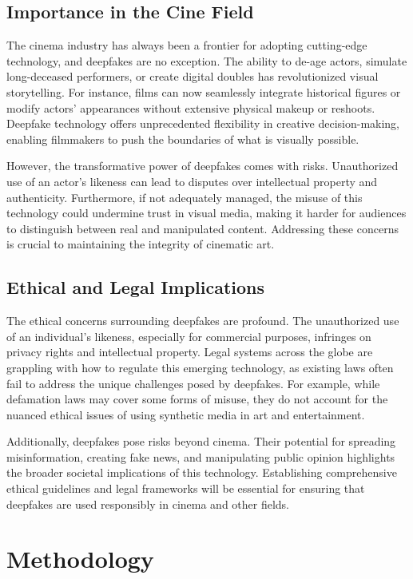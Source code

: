 \documentclass[12pt]{article}
\begin{document}
\subsection{Importance in the Cine Field}
The cinema industry has always been a frontier for adopting cutting-edge technology, and deepfakes are no exception. The ability to de-age actors, simulate long-deceased performers, or create digital doubles has revolutionized visual storytelling. For instance, films can now seamlessly integrate historical figures or modify actors’ appearances without extensive physical makeup or reshoots. Deepfake technology offers unprecedented flexibility in creative decision-making, enabling filmmakers to push the boundaries of what is visually possible. 

However, the transformative power of deepfakes comes with risks. Unauthorized use of an actor’s likeness can lead to disputes over intellectual property and authenticity. Furthermore, if not adequately managed, the misuse of this technology could undermine trust in visual media, making it harder for audiences to distinguish between real and manipulated content. Addressing these concerns is crucial to maintaining the integrity of cinematic art.

\subsection{Ethical and Legal Implications}
The ethical concerns surrounding deepfakes are profound. The unauthorized use of an individual’s likeness, especially for commercial purposes, infringes on privacy rights and intellectual property. Legal systems across the globe are grappling with how to regulate this emerging technology, as existing laws often fail to address the unique challenges posed by deepfakes. For example, while defamation laws may cover some forms of misuse, they do not account for the nuanced ethical issues of using synthetic media in art and entertainment.

Additionally, deepfakes pose risks beyond cinema. Their potential for spreading misinformation, creating fake news, and manipulating public opinion highlights the broader societal implications of this technology. Establishing comprehensive ethical guidelines and legal frameworks will be essential for ensuring that deepfakes are used responsibly in cinema and other fields.

\section{Methodology}
\end{document}
